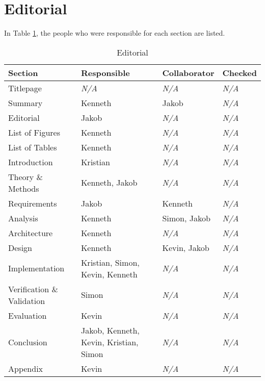 \section{Editorial}
In Table \ref{table:editorial}, the people who were responsible for each section
are listed.
\begin{table}[ht]
    \begin{tabularx}{\textwidth}{|>{\RaggedRight}X|>{\RaggedRight}X|>{\RaggedRight}X|>{\RaggedRight}X|}
        \hline
        \textbf{Section} & \textbf{Responsible} & \textbf{Collaborator} & \textbf{Checked}\\
        \hline
        Titlepage & \textit{N/A} & \textit{N/A} & \textit{N/A}\\
        \hline
        Summary & Kenneth & Jakob & \textit{N/A}\\
        \hline
        Editorial & Jakob & \textit{N/A} & \textit{N/A}\\
        \hline
        List of Figures & Kenneth & \textit{N/A} & \textit{N/A}\\
        \hline
        List of Tables & Kenneth & \textit{N/A} & \textit{N/A}\\
        \hline
        Introduction & Kristian & \textit{N/A} & \textit{N/A}\\
        \hline
        Theory \& Methods & Kenneth, Jakob & \textit{N/A} & \textit{N/A}\\
        \hline
        Requirements & Jakob & Kenneth & \textit{N/A}\\
        \hline
        Analysis & Kenneth & Simon, Jakob & \textit{N/A}\\
        \hline
        Architecture & Kenneth & \textit{N/A} & \textit{N/A}\\
        \hline
        Design & Kenneth & Kevin, Jakob & \textit{N/A}\\
        \hline
        Implementation & Kristian, Simon, Kevin, Kenneth & \textit{N/A} & \textit{N/A}\\
        \hline
        Verification \& Validation & Simon & \textit{N/A} & \textit{N/A}\\
        \hline
        Evaluation & Kevin & \textit{N/A} & \textit{N/A}\\
        \hline
        Conclusion & Jakob, Kenneth, Kevin, Kristian, Simon & \textit{N/A} & \textit{N/A}\\
        \hline
        Appendix & Kevin & \textit{N/A} & \textit{N/A}\\
        \hline
    \end{tabularx}
    \caption{Editorial} 
    \label{table:editorial}
\end{table} 